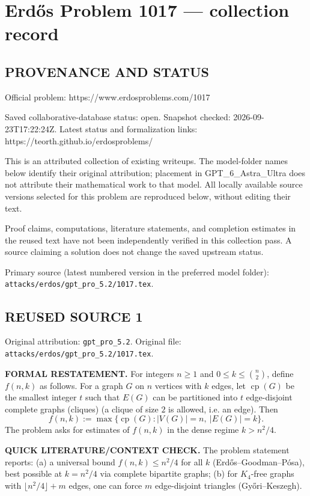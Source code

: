 \section*{Erd\H{o}s Problem 1017 --- collection record}

\subsection*{PROVENANCE AND STATUS}
Official problem: https://www.erdosproblems.com/1017

Saved collaborative-database status: open.
Snapshot checked: 2026-09-23T17:22:24Z.
Latest status and formalization links: https://teorth.github.io/erdosproblems/

This is an attributed collection of existing writeups. The model-folder names below identify their original attribution; placement in GPT\_6\_Astra\_Ultra does not attribute their mathematical work to that model. All locally available source versions selected for this problem are reproduced below, without editing their text.

Proof claims, computations, literature statements, and completion estimates in the reused text have not been independently verified in this collection pass. A source claiming a solution does not change the saved upstream status.

Primary source (latest numbered version in the preferred model folder): \texttt{attacks/erdos/gpt\_pro\_5.2/1017.tex}.

\subsection*{REUSED SOURCE 1}
Original attribution: \texttt{gpt\_pro\_5.2}.
Original file: \texttt{attacks/erdos/gpt\_pro\_5.2/1017.tex}.


\noindent\textbf{FORMAL RESTATEMENT.}
For integers $n\ge 1$ and $0\le k\le \binom{n}{2}$, define $f(n,k)$ as follows.
For a graph $G$ on $n$ vertices with $k$ edges, let $\operatorname{cp}(G)$ be the smallest integer $t$ such that $E(G)$ can be partitioned into $t$ edge-disjoint complete graphs (cliques) (a clique of size $2$ is allowed, i.e. an edge).
Then
\[
f(n,k):=\max\{\operatorname{cp}(G): |V(G)|=n,\ |E(G)|=k\}.
\]
The problem asks for estimates of $f(n,k)$ in the dense regime $k>n^2/4$.

\medskip
\noindent\textbf{QUICK LITERATURE/CONTEXT CHECK.}
The problem statement reports: (a) a universal bound $f(n,k)\le n^2/4$ for all $k$ (Erd\H{o}s--Goodman--P\'osa), best possible at $k=n^2/4$ via complete bipartite graphs; (b) for $K_4$-free graphs with $\lfloor n^2/4\rfloor+m$ edges, one can force $m$ edge-disjoint triangles (Gy\H{o}ri--Keszegh).

